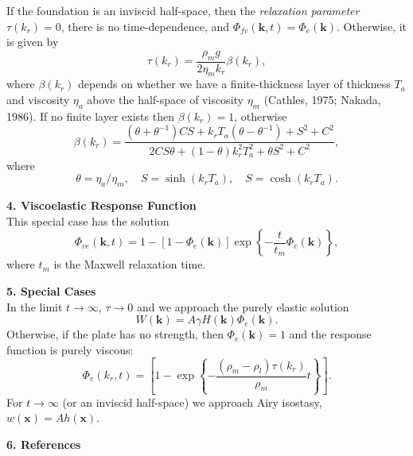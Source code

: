 \documentclass[12pt]{article}
\begin{document}
If the foundation is an inviscid half-space, then the {\it relaxation parameter} $\tau(k_r) = 0$, there is no time-dependence,
and $\Phi_{fv}(\mathbf{k},t) = \Phi_e(\mathbf{k})$. Otherwise, it is given by
\begin{equation}
\tau(k_r) = \frac{\rho_m g}{2 \eta_m k_r} \beta(k_r),
\label{eq:Eq_10}
\end{equation}
where $\beta(k_r)$ depends on whether we have a finite-thickness layer of thickness $T_a$ and viscosity
$\eta_a$ above the half-space of viscosity $\eta_m$ (Cathles, 1975; Nakada, 1986).
If no finite layer exists then $\beta(k_r) = 1$, otherwise
\begin{equation}
\beta(k_r) = \frac{(\theta + \theta^{-1}) CS + k_r T_a (\theta - \theta^{-1}) + S^2 + C^2}{2CS\theta + (1-\theta)k_r^2 T_a^2 + \theta S^2 + C^2},
\label{eq:Eq_11}
\end{equation}
where
\begin{equation}
\theta = \eta_a/\eta_m, \quad S = \sinh (k_r T_a), \quad S = \cosh (k_r T_a).
\label{eq:Eq_12}
\end{equation}

{\center \bf 4. Viscoelastic Response Function}\\

This special case has the solution
\begin{equation}
\Phi_{ve}(\mathbf{k},t) = 1 - \left [ 1 - \Phi_e(\mathbf{k}) \right ] \exp \left \{ - \frac{t}{t_m} \Phi_e(\mathbf{k}) \right \},
\end{equation}
where $t_m$ is the Maxwell relaxation time.

{\center \bf 5. Special Cases}\\

\noindent
In the limit $t \rightarrow \infty$, $\tau  \rightarrow0$ and we approach the purely elastic solution
\begin{equation}
W(\mathbf{k}) = A \gamma H(\mathbf{k}) \Phi_e(\mathbf{k}).
\label{eq:Eq21}
\end{equation}
Otherwise, if the plate has no strength, then $\Phi_e(\mathbf{k}) = 1$ and the response function is {purely viscous}:
\begin{equation}
\Phi_v(k_r,t) = \left [ 1 - \exp \left \{ - \frac{(\rho_m - \rho_l) \tau(k_r)}{\rho_m} t \right \} \right ].
\label{eq:Eq19b}
\end{equation}
For $t \rightarrow \infty$ (or an inviscid half-space) we approach Airy isostasy, $w(\mathbf{x}) = A h(\mathbf{x})$.

{\center \bf 6. References}\\
\end{document}
